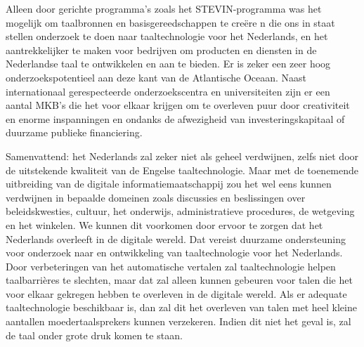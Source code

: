\begin{multicols}{2}
Alleen door gerichte programma's zoals het STEVIN-programma was het mogelijk om taalbronnen en basisgereedschappen te cre{\"e}re n die ons  in staat stellen onderzoek te doen naar taaltechnologie voor het Nederlands, en het aantrekkelijker te maken voor bedrijven om producten en diensten in de Nederlandse taal te ontwikkelen en aan te bieden. Er is zeker een zeer hoog onderzoekspotentieel aan deze kant van de Atlantische Oceaan. Naast internationaal gerespecteerde onderzoekscentra en universiteiten zijn er een aantal MKB's die het voor elkaar krijgen om te overleven puur door creativiteit en enorme inspanningen en ondanks de afwezigheid van investeringskapitaal of duurzame publieke financiering.

Samenvattend: het Nederlands zal zeker niet als geheel verdwijnen, zelfs niet door de uitstekende kwaliteit van de Engelse taaltechnologie. Maar met de toenemende uitbreiding van de digitale informatiemaatschappij  zou het wel eens kunnen verdwijnen in bepaalde domeinen zoals discussies en beslissingen over beleidskwesties, cultuur, het onderwijs, administratieve procedures, de wetgeving en het winkelen. We kunnen dit voorkomen door ervoor te zorgen dat het Nederlands overleeft in de digitale wereld. Dat vereist duurzame ondersteuning voor onderzoek naar en ontwikkeling van taaltechnologie voor het Nederlands. 
Door verbeteringen van het automatische vertalen zal taaltechnologie helpen taalbarri{\`e}res te slechten, maar dat zal alleen kunnen gebeuren voor talen die het voor elkaar gekregen hebben te overleven in de digitale wereld.
Als er adequate taaltechnologie beschikbaar is, dan zal dit het overleven van talen met heel kleine aantallen moedertaalsprekers kunnen verzekeren. Indien dit niet het geval is, zal de taal onder grote druk komen te staan.


\end{multicols}

\clearpage



